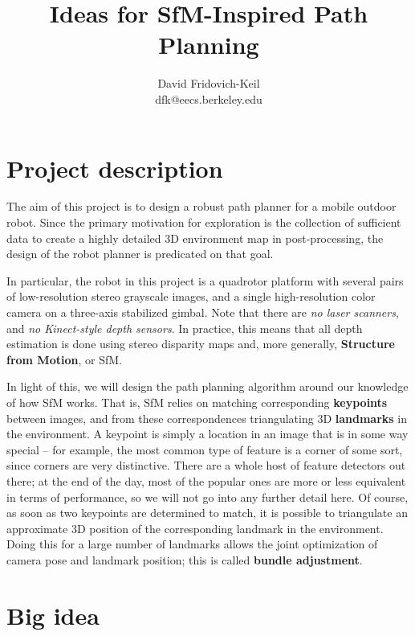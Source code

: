 \documentclass[12pt]{article}
\begin{document}
\title{Ideas for SfM-Inspired Path Planning}
\author{David Fridovich-Keil \\ dfk@eecs.berkeley.edu}
\maketitle

\section{Project description}

The aim of this project is to design a robust path planner for a mobile outdoor robot. Since the primary motivation for exploration is the collection of sufficient data to create a highly detailed 3D environment map in post-processing, the design of the robot planner is predicated on that goal.

In particular, the robot in this project is a quadrotor platform with several pairs of low-resolution stereo grayscale images, and a single high-resolution color camera on a three-axis stabilized gimbal. Note that there are \textit{no laser scanners}, and \textit{no Kinect-style depth sensors}. In practice, this means that all depth estimation is done using stereo disparity maps and, more generally, \textbf{Structure from Motion}, or SfM.

In light of this, we will design the path planning algorithm around our knowledge of how SfM works. That is, SfM relies on matching corresponding \textbf{keypoints} between images, and from these correspondences triangulating 3D \textbf{landmarks} in the environment. A keypoint is simply a location in an image that is in some way special -- for example, the most common type of feature is a corner of some sort, since corners are very distinctive. There are a whole host of feature detectors out there; at the end of the day, most of the popular ones are more or less equivalent in terms of performance, so we will not go into any further detail here. Of course, as soon as two keypoints are determined to match, it is possible to triangulate an approximate 3D position of the corresponding landmark in the environment. Doing this for a large number of landmarks allows the joint optimization of camera pose and landmark position; this is called \textbf{bundle adjustment}.

\section{Big idea}
\end{document}
